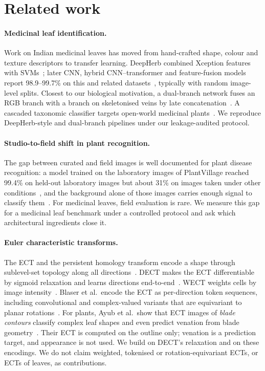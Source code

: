 \section{Related work}
\label{sec:related}

\paragraph{Medicinal leaf identification.} Work on Indian medicinal leaves has moved from
hand-crafted shape, colour and texture descriptors to transfer learning. DeepHerb combined Xception
features with SVMs~\citep{roopashree2021deepherb}; later CNN, hybrid CNN--transformer and feature-fusion
models report 98.9--99.7\% on this and related datasets~\citep{ffncacnn2025}, typically with random
image-level splits. Closest to our biological motivation, a dual-branch network fuses an RGB branch
with a branch on skeletonised veins by late concatenation~\citep{dualbranch2026}. A cascaded
taxonomic classifier targets open-world medicinal plants~\citep{openworld2025medicinal}. We reproduce
DeepHerb-style and dual-branch pipelines under our leakage-audited protocol.

\paragraph{Studio-to-field shift in plant recognition.} The gap between curated and field images is
well documented for plant disease recognition: a model trained on the laboratory images of
PlantVillage reached 99.4\% on held-out laboratory images but about 31\% on images taken under
other conditions~\citep{mohanty2016plantvillage}, and the background alone of those images carries
enough signal to classify them~\citep{noyan2022plantvillagebias}. For medicinal leaves, field
evaluation is rare. We measure this gap for a medicinal leaf benchmark under a controlled protocol and
ask which architectural ingredients close it.

\paragraph{Euler characteristic transforms.} The ECT and the persistent homology transform encode a
shape through sublevel-set topology along all directions~\citep{turner2014pht}. DECT makes the ECT
differentiable by sigmoid relaxation and learns directions end-to-end~\citep{roell2024dect}. WECT
weights cells by image intensity~\citep{cisewski2023wect}. Blaser et al.\ encode the ECT as
per-direction token sequences, including convolutional and complex-valued variants that are
equivariant to planar rotations~\citep{blaser2026encoding}. For plants, Ayub et al.\ show that ECT
images of \emph{blade contours} classify complex leaf shapes and even predict venation from blade
geometry~\citep{ayub2026ectplants}. Their ECT is computed on the outline only; venation is a
prediction target, and appearance is not used. We build on DECT's relaxation and on these encodings.
We do not claim weighted, tokenised or rotation-equivariant ECTs, or ECTs of leaves, as contributions.

